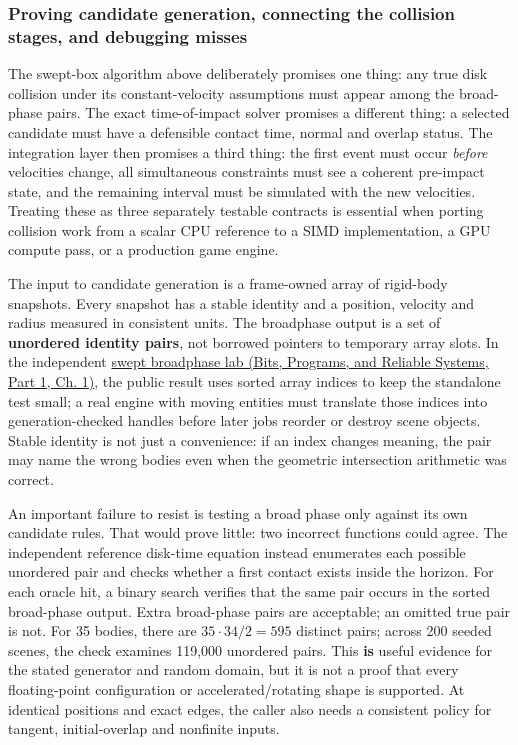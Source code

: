 \subsubsection{Proving candidate generation, connecting the collision stages, and debugging misses}\label{04-visual-computing-ii-ch026-proving-candidate-generation-connecting-the-collision-stages-and-debugging-misses}

\hypertarget{04-visual-computing-ii-ch026-proving-candidate-generation-connecting-the-collision-stages-and-debugging-misses}{}

The swept-box algorithm above deliberately promises one thing: any true disk collision under its constant-velocity assumptions must appear among the broad-phase pairs. The exact time-of-impact solver promises a different thing: a selected candidate must have a defensible contact time, normal and overlap status. The integration layer then promises a third thing: the first event must occur \emph{before} velocities change, all simultaneous constraints must see a coherent pre-impact state, and the remaining interval must be simulated with the new velocities. Treating these as three separately testable contracts is essential when porting collision work from a scalar CPU reference to a SIMD implementation, a GPU compute pass, or a production game engine.

The input to candidate generation is a frame-owned array of rigid-body snapshots. Every snapshot has a stable identity and a position, velocity and radius measured in consistent units. The broadphase output is a set of \textbf{unordered identity pairs}, not borrowed pointers to temporary array slots. In the independent \href{../01-Bits-Programs-and-Reliable-Systems-P01/main.pdf\#nameddest=source-file-6597829be009fc0bb1b17d87}{swept broadphase lab (Bits, Programs, and Reliable Systems, Part 1, Ch. 1)}, the public result uses sorted array indices to keep the standalone test small; a real engine with moving entities must translate those indices into generation-checked handles before later jobs reorder or destroy scene objects. Stable identity is not just a convenience: if an index changes meaning, the pair may name the wrong bodies even when the geometric intersection arithmetic was correct.

An important failure to resist is testing a broad phase only against its own candidate rules. That would prove little: two incorrect functions could agree. The independent reference disk-time equation instead enumerates each possible unordered pair and checks whether a first contact exists inside the horizon. For each oracle hit, a binary search verifies that the same pair occurs in the sorted broad-phase output. Extra broad-phase pairs are acceptable; an omitted true pair is not. For 35 bodies, there are \(35\cdot34/2=595\) distinct pairs; across 200 seeded scenes, the check examines 119,000 unordered pairs. This \textbf{is} useful evidence for the stated generator and random domain, but it is not a proof that every floating-point configuration or accelerated/rotating shape is supported. At identical positions and exact edges, the caller also needs a consistent policy for tangent, initial-overlap and nonfinite inputs.

